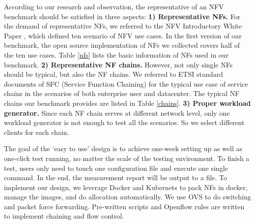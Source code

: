 According to our research and observation,
the representative of an NFV benchmark
should be satisfied in three aspects:
\textbf{1) Representative NFs.}
For the demand of representative NFs,
we referred to the NFV Introductory White Paper \cite{},
which defined ten scenario of NFV use cases.
In the first version of our benchmark,
the open source implementation of NFs we collected
covers half of the ten use cases.
Table \ref{nfs} lists the basic information of NFs used in our benchmark.
\textbf{2) Representative NF chains.}
However, not only single NFs should be typical, but also the NF chains.
We referred to ETSI standard documents of SFC
(Service Function Chaining) \cite{draft-ietf-sfc-dc-use-cases-06}
for the typical use case of service chains
in the scenarios of both enterprise user and datacenter.
The typical NF chains our benchmark provides are listed in Table \ref{chains}.
\textbf{3) Proper workload generator.}
Since each NF chain serves at different network level,
only one workload generator is not enough to test all the scenarios.
So we select different clients for each chain.


The goal of the `easy to use' design is to
achieve one-week setting up as well as one-click test running,
no matter the scale of the testing environment.
To finish a test, users only need to touch one configuration file
and execute one single command.
In the end, the measurement report will be output to a file.
To implement our design,
we leverage Docker and Kubernets to pack NFs in docker,
manage the images, and do allocation automatically.
We use OVS to do switching and packet force forwarding.
Pre-written scripts and Openflow rules are written
to implement chaining and flow control.

